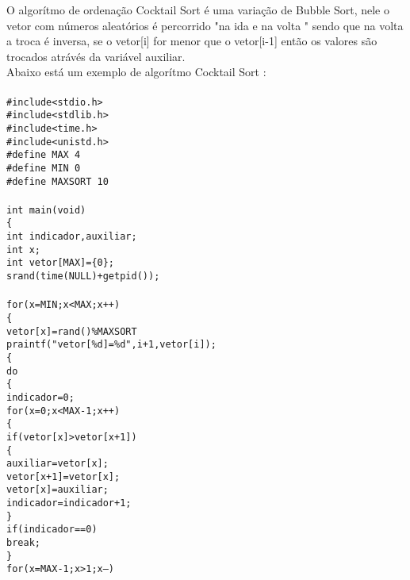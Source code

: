 \documentclass[11pts]{book}
\begin{document}
O algorítmo de ordenação Cocktail Sort é uma variação de Bubble Sort, nele o vetor com números aleatórios é percorrido "na ida e na volta " sendo que na volta a troca é inversa, se o vetor[i] for menor que o vetor[i-1] então os valores são trocados atrávés da variável auxiliar.\\

Abaixo está um exemplo de algorítmo Cocktail Sort :\\

\texttt{ \\
\#include<stdio.h>\\
 \#include<stdlib.h> \\ 
\#include<time.h>\\
\#include<unistd.h>\\
\#define MAX 4\\
\#define MIN 0 \\
\#define MAXSORT 10 \\ \\
int main(void) \\
\{ \\
int indicador,auxiliar;\\
int x;\\
 int vetor[MAX]=\{0\}; \\
srand(time(NULL)+getpid()); \\ \\
for(x=MIN;x<MAX;x++) \\ 
\{ \\
vetor[x]=rand()\%MAXSORT \\
praintf("vetor[\%d]=\%d",i+1,vetor[i]); \\
\{ \\
do\\
\{ \\
indicador=0; \\
for(x=0;x<MAX-1;x++) \\
\{ \\
if(vetor[x]>vetor[x+1])\\
\{ \\
auxiliar=vetor[x];\\
vetor[x+1]=vetor[x];\\
vetor[x]=auxiliar; \\
indicador=indicador+1; \\
\} \\
if(indicador==0)\\
break; \\
\} \\
for(x=MAX-1;x>1;x--)\\
}
\end{document}
